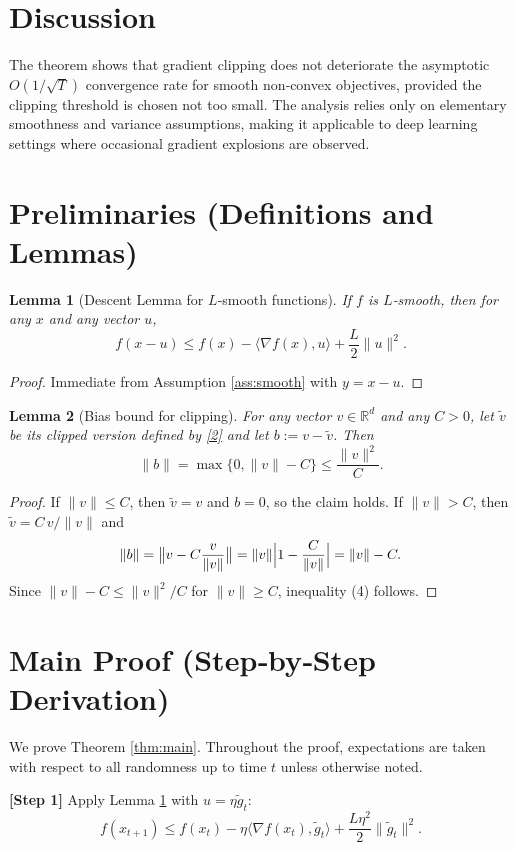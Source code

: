 \documentclass{article}
\newtheorem{lemma}{Lemma}
\newcommand{\R}{\mathbb{R}}
\begin{document}
\section*{Discussion}
The theorem shows that gradient clipping does not deteriorate the
asymptotic $O(1/\sqrt{T})$ convergence rate for smooth non‑convex objectives,
provided the clipping threshold is chosen not too small.  The analysis
relies only on elementary smoothness and variance assumptions, making it
applicable to deep learning settings where occasional gradient explosions are
observed.

\newpage

\section*{Preliminaries (Definitions and Lemmas)}
\begin{lemma}[Descent Lemma for $L$‑smooth functions]\label{lem:descent}
If $f$ is $L$‑smooth, then for any $x$ and any vector $u$,
\[
f(x-u)\le f(x)-\langle\nabla f(x),u\rangle+\frac{L}{2}\|u\|^2 .
\]
\end{lemma}
\begin{proof}
Immediate from Assumption \ref{ass:smooth} with $y=x-u$.
\end{proof}

\begin{lemma}[Bias bound for clipping]\label{lem:bias}
For any vector $v\in\R^d$ and any $C>0$, let $\tilde v$ be its clipped version defined
by \eqref{2} and let $b:=v-\tilde v$. Then
\[
\|b\|= \max\{0,\|v\|-C\}\le\frac{\|v\|^2}{C}.
\tag{4}
\]
\end{lemma}
\begin{proof}
If $\|v\|\le C$, then $\tilde v=v$ and $b=0$, so the claim holds.
If $\|v\|>C$, then $\tilde v=C\,v/\|v\|$ and
\[
\|b\| =\bigl\|v-C\frac{v}{\|v\|}\bigr\|
= \|v\|\Bigl|1-\frac{C}{\|v\|}\Bigr|
= \|v\|-C .
\]
Since $\|v\|-C\le\|v\|^2/C$ for $\|v\|\ge C$, inequality (4) follows.
\end{proof}

\section*{Main Proof (Step‑by‑Step Derivation)}
We prove Theorem \ref{thm:main}.  Throughout the proof, expectations are taken
with respect to all randomness up to time $t$ unless otherwise noted.

\bigskip
\noindent\textbf{[Step 1]} Apply Lemma \ref{lem:descent} with $u=\eta\tilde g_t$:
\[
f(x_{t+1})\le f(x_t)-\eta\langle\nabla f(x_t),\tilde g_t\rangle
+\frac{L\eta^{2}}{2}\|\tilde g_t\|^{2}.
\tag{5}
\]
\end{document}
